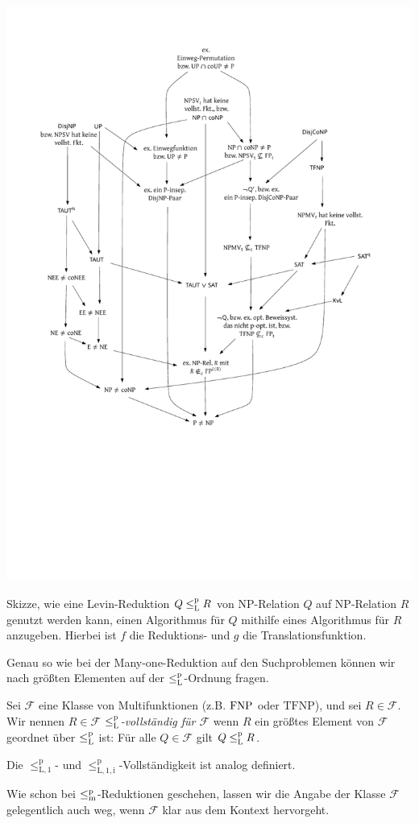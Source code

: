 \begin{marginfigure}
    \centering\includegraphics[page=10]{figures.pdf}\vspace*{2ex}
    \caption{Skizze, wie eine Levin-Reduktion $Q\leq_\mathrm{L}^\mathrm{p} R$ von NP-Relation $Q$ auf NP-Relation $R$ genutzt werden kann, einen Algorithmus für $Q$ mithilfe eines Algorithmus für $R$ anzugeben. Hierbei ist $f$ die Reduktions- und $g$ die Translationsfunktion.}
\end{marginfigure}

Genau so wie bei der Many-one-Reduktion auf den Suchproblemen können wir nach größten Elementen auf der $\leq_\mathrm{L}^\mathrm{p}$-Ordnung fragen.

\begin{definition}
    Sei $\mathcal F$ eine Klasse von Multifunktionen (z.B. $\mathrm{FNP}$ oder $\mathrm{TFNP}$), und sei $R\in\mathcal F$.
    Wir nennen $R\in\mathcal F$ \emph{$\leq_\mathrm{L}^\mathrm{p}$-vollständig für $\mathcal F$} wenn $R$ ein größtes Element von $\mathcal F$ geordnet über $\leq_\mathrm{L}^\mathrm{p}$ ist:
    Für alle $Q\in\mathcal F$ gilt $Q\leq_\mathrm{L}^\mathrm{p} R$.

    Die $\leq_\mathrm{L,1}^\mathrm p$- und $\leq_\mathrm{L,1,i}^\mathrm p$-Vollständigkeit ist analog definiert.
\end{definition}
Wie schon bei $\leq_\mathrm{m}^\mathrm{p}$-Reduktionen geschehen, lassen wir die Angabe der Klasse $\mathcal F$ gelegentlich auch weg, wenn $\mathcal F$ klar aus dem Kontext hervorgeht.

